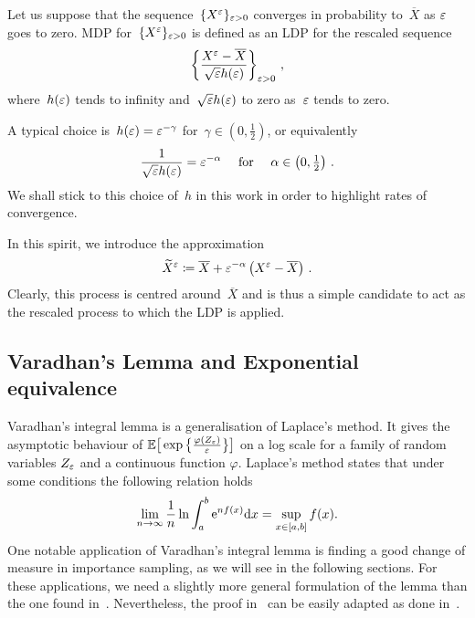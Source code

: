 \begin{definition}
Let us suppose that the sequence~$\{X^{\varepsilon}\}_{\varepsilon>0}$ converges in probability to~$\overline{X}$ as $\varepsilon$ goes to zero. MDP for~$\{X^{\varepsilon}\}_{\varepsilon>0}$ is defined as an LDP for the rescaled sequence 
$$
\left\{\frac{X^{\varepsilon} - \overline{X}}{\sqrt{\varepsilon}h(\varepsilon)}
\right\}_{\varepsilon>0}\,,
$$
where~$h(\varepsilon)$ tends to infinity and~$\sqrt{\varepsilon}h(\varepsilon)$ to zero as~$\varepsilon$ tends to zero. 
\end{definition}
\begin{remark}
   A typical choice is~$h(\varepsilon) = \varepsilon^{-\gamma}$ for~$\gamma \in (0,\frac{1}{2})$, or equivalently
   $$\frac{1}{\sqrt{\varepsilon}h(\varepsilon)} = \varepsilon^{-\alpha} \quad \text{ for } \quad \alpha\in\left(0,\tfrac{1}{2}\right)\,.$$
   We shall stick to this choice of~$h$ in this work in order to highlight rates of convergence. 
\end{remark}

In this spirit, we introduce the approximation
\begin{equation}\label{eq:MDPSmallNoiseGeneral}
\widetilde{X}^{\varepsilon} \coloneqq \overline{X} + 
\varepsilon^{-\alpha}\left(X^{\varepsilon} - \overline{X}\right)\,.
\end{equation}
Clearly, this process is centred around~$\overline{X}$ and is thus a simple candidate to act as the rescaled process to which the LDP is applied. 


\subsection{Varadhan's Lemma and Exponential equivalence}\label{sec:varadhan}

Varadhan's integral lemma is a generalisation of Laplace's method. It gives the asymptotic behaviour of $\mathbb{E}\big[\exp\big\{\frac{\varphi(Z_{\varepsilon})}{\varepsilon}\big\}\big]$ on a log scale for a family of random variables $Z_{\varepsilon}$ and a continuous function $\varphi$. Laplace's method states that under some conditions the following relation holds
$$\lim_{n\rightarrow\infty}\frac{1}{n}\ln \int_a^b \mathrm{e}^{n f(x)} \mathrm{d} x = \sup\limits_{x\in[a,b]}f(x).$$
One notable application of Varadhan's integral lemma is finding a good change of measure in importance sampling, as we will see in the following sections. For these applications, we need a slightly more general formulation of the lemma than the one found in~\cite[Theorem~4.3.1]{Dembo2010LargeApplications}. Nevertheless, the proof in~\cite[Theorem~4.3.1]{Dembo2010LargeApplications} can be easily adapted as done in~\cite[Lemma~4.4.]{Robertson2010SampleModels}.

